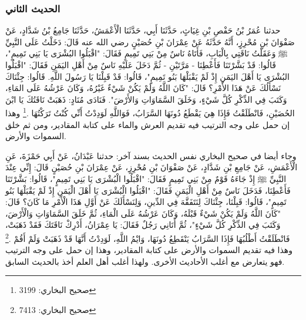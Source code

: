 \subsubsection{الحديث الثاني}
\label{sec:app_first_creation_hadith_2}

حدثنا عُمَرُ بْنُ حَفْصِ بْنِ غِيَاثٍ، حَدَّثَنَا أَبِي، حَدَّثَنَا الْأَعْمَشُ، حَدَّثَنَا جَامِعُ بْنُ شَدَّادٍ، عَنْ صَفْوَانَ بْنِ مُحْرِزٍ، أَنَّهُ حَدَّثَهُ عَنْ عِمْرَانَ بْنِ حُصَيْنٍ رضي الله عنه قَالَ: دَخَلْتُ عَلَى النَّبِيِّ ﷺ وَعَقَلْتُ نَاقَتِي بِالْبَابِ، فَأَتَاهُ نَاسٌ مِنْ بَنِي تَمِيمٍ فَقَالَ: "اقْبَلُوا البُشْرَى يَا بَنِي تَمِيمٍ"، قَالُوا: قَدْ بَشَّرْتَنَا فَأَعْطِنَا - مَرَّتَيْنِ - ثُمَّ دَخَلَ عَلَيْهِ نَاسٌ مِنْ أَهْلِ اليَمَنِ فَقَالَ: "اقْبَلُوا البُشْرَى يَا أَهْلَ اليَمَنِ إِذْ لَمْ يَقْبَلْهَا بَنُو تَمِيمٍ"، قَالُوا: قَدْ قَبِلْنَا يَا رَسُولَ اللَّهِ. قَالُوا: جِئْنَاكَ نَسْأَلُكَ عَنْ هَذَا الأَمْرِ؟ قَالَ: "كَانَ اللَّهُ وَلَمْ يَكُنْ شَيْءٌ غَيْرُهُ، وَكَانَ عَرْشُهُ عَلَى المَاءِ، وَكَتَبَ فِي الذِّكْرِ كُلَّ شَيْءٍ، وَخَلَقَ السَّمَاوَاتِ وَالأَرْضَ". فَنَادَى مُنَادٍ: ذَهَبَتْ نَاقَتُكَ يَا ابْنَ الحُصَيْنِ، فَانْطَلَقْتُ فَإِذَا هِيَ يَقْطَعُ دُونَهَا السَّرَابُ، فَوَاللَّهِ لَوَدِدْتُ أَنِّي كُنْتُ تَرَكْتُهَا \href{https://shamela.ws/book/1284/2020#p2}{\faExternalLink} \cite{bukhari}.\footnote{صحيح البخاري: 3199} وهذا إن حمل على وجه الترتيب فيه تقديم العرش والماء على كتابة المقادير، ومن ثم خلق السموات والأرض.

وجاء أيضا في صحيح البخاري نفس الحديث بسند آخر:
حدثنا عَبْدَانُ، عَنْ أَبِي حَمْزَةَ، عَنِ الْأَعْمَشِ، عَنْ جَامِعِ بْنِ شَدَّادٍ، عَنْ صَفْوَانَ بْنِ مُحْرِزٍ، عَنْ عِمْرَانَ بْنِ حُصَيْنٍ قَالَ: إِنِّي عِنْدَ النَّبِيِّ ﷺ إِذْ جَاءَهُ قَوْمٌ مِنْ بَنِي تَمِيمٍ فَقَالَ: "اقْبَلُوا الْبُشْرَى يَا بَنِي تَمِيمٍ"، قَالُوا: بَشَّرْتَنَا فَأَعْطِنَا، فَدَخَلَ نَاسٌ مِنْ أَهْلِ الْيَمَنِ فَقَالَ: "اقْبَلُوا الْبُشْرَى يَا أَهْلَ الْيَمَنِ إِذْ لَمْ يَقْبَلْهَا بَنُو تَمِيمٍ"، قَالُوا: قَبِلْنَا، جِئْنَاكَ لِنَتَفَقَّهَ فِي الدِّينِ، وَلِنَسْأَلَكَ عَنْ أَوَّلِ هَذَا الْأَمْرِ مَا كَانَ؟ قَالَ: "كَانَ اللَّهُ وَلَمْ يَكُنْ شَيْءٌ قَبْلَهُ، وَكَانَ عَرْشُهُ عَلَى الْمَاءِ، ثُمَّ خَلَقَ السَّمَاوَاتِ وَالْأَرْضَ، وَكَتَبَ فِي الذِّكْرِ كُلَّ شَيْءٍ"، ثُمَّ أَتَانِي رَجُلٌ فَقَالَ: يَا عِمْرَانُ، أَدْرِكْ نَاقَتَكَ فَقَدْ ذَهَبَتْ، فَانْطَلَقْتُ أَطْلُبُهَا فَإِذَا السَّرَابُ يَنْقَطِعُ دُونَهَا، وَايْمُ اللَّهِ، لَوَدِدْتُ أَنَّهَا قَدْ ذَهَبَتْ وَلَمْ أَقُمْ \href{https://shamela.ws/book/1284/4624#p6}{\faExternalLink} \cite{bukhari}.\footnote{صحيح البخاري: 7413} وهذا فيه تقديم السموات والأرض على كتابة المقادير، وهذا إن حمل على وجه الترتيب فهو يتعارض مع أغلب الأحاديث الأخرى. ولهذا أغلب أهل العلم أخذ بالحديث السابق. 

